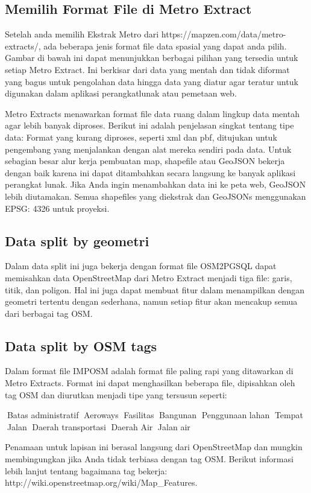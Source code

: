 \subsection{Memilih Format File di Metro Extract}
Setelah anda memilih Ekstrak Metro dari https://mapzen.com/data/metro-extracts/, ada beberapa jenis format file data spasial yang dapat
anda pilih. Gambar di bawah ini dapat menunjukkan berbagai pilihan yang tersedia untuk setiap Metro Extract. Ini berkisar dari data yang
mentah dan tidak diformat yang bagus untuk pengolahan data hingga data yang diatur agar teratur untuk digunakan dalam aplikasi perangkatlunak atau pemetaan web.

Metro Extracts menawarkan format file data ruang dalam lingkup data mentah agar lebih banyak diproses. 
Berikut ini adalah penjelasan singkat tentang tipe data: Format yang kurang diproses, seperti xml dan pbf, ditujukan untuk pengembang yang menjalankan dengan alat mereka sendiri pada data. 
Untuk sebagian besar alur kerja pembuatan map, shapefile atau GeoJSON bekerja dengan baik karena ini dapat ditambahkan secara langsung ke banyak aplikasi perangkat lunak. 
Jika Anda ingin menambahkan data ini ke peta web, GeoJSON lebih diutamakan. Semua shapefiles yang diekstrak dan GeoJSONs menggunakan EPSG: 4326 untuk proyeksi.

\subsection{Data split by geometri}
Dalam data split ini juga bekerja dengan format file OSM2PGSQL dapat memisahkan data OpenStreetMap dari Metro Extract menjadi tiga file: garis, titik, dan poligon. 
Hal ini juga dapat membuat fitur dalam menampilkan dengan geometri tertentu dengan sederhana, namun setiap fitur akan mencakup semua dari berbagai tag OSM. 

\subsection{Data split by OSM tags}
Dalam format file IMPOSM adalah format file paling rapi yang ditawarkan di Metro Extracts. 
Format ini dapat menghasilkan beberapa file, dipisahkan oleh tag OSM dan diurutkan menjadi tipe yang tersusun seperti:

Batas administratif
Aeroways
Fasilitas
Bangunan
Penggunaan lahan
Tempat
Jalan
Daerah transportasi
Daerah Air
Jalan air

Penamaan untuk lapisan ini berasal langsung dari OpenStreetMap dan mungkin membingungkan jika Anda tidak terbiasa dengan tag OSM.
Berikut informasi lebih lanjut tentang bagaimana tag bekerja: http://wiki.openstreetmap.org/wiki/Map_Features.

